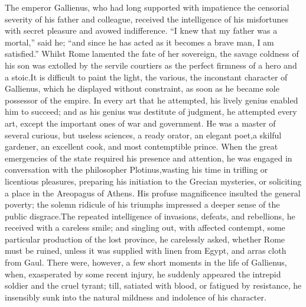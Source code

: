 

The emperor Gallienus, who had long supported with impatience the
censorial severity of his father and colleague, received the
intelligence of his misfortunes with secret pleasure and avowed
indifference. “I knew that my father was a mortal,” said he; “and
since he has acted as it becomes a brave man, I am satisfied.”
Whilst Rome lamented the fate of her sovereign, the savage
coldness of his son was extolled by the servile courtiers as the
perfect firmness of a hero and a stoic.\footnotemark[152] It is difficult to
paint the light, the various, the inconstant character of
Gallienus, which he displayed without constraint, as soon as he
became sole possessor of the empire. In every art that he
attempted, his lively genius enabled him to succeed; and as his
genius was destitute of judgment, he attempted every art, except
the important ones of war and government. He was a master of
several curious, but useless sciences, a ready orator, an elegant
poet,\footnotemark[153] a skilful gardener, an excellent cook, and most
contemptible prince. When the great emergencies of the state
required his presence and attention, he was engaged in
conversation with the philosopher Plotinus,\footnotemark[154] wasting his time
in trifling or licentious pleasures, preparing his initiation to
the Grecian mysteries, or soliciting a place in the Areopagus of
Athens. His profuse magnificence insulted the general poverty;
the solemn ridicule of his triumphs impressed a deeper sense of
the public disgrace.\footnotemark[155] The repeated intelligence of invasions,
defeats, and rebellions, he received with a careless smile; and
singling out, with affected contempt, some particular production
of the lost province, he carelessly asked, whether Rome must be
ruined, unless it was supplied with linen from Egypt, and arras
cloth from Gaul. There were, however, a few short moments in the
life of Gallienus, when, exasperated by some recent injury, he
suddenly appeared the intrepid soldier and the cruel tyrant;
till, satiated with blood, or fatigued by resistance, he
insensibly sunk into the natural mildness and indolence of his
character.\footnotemark[156]

